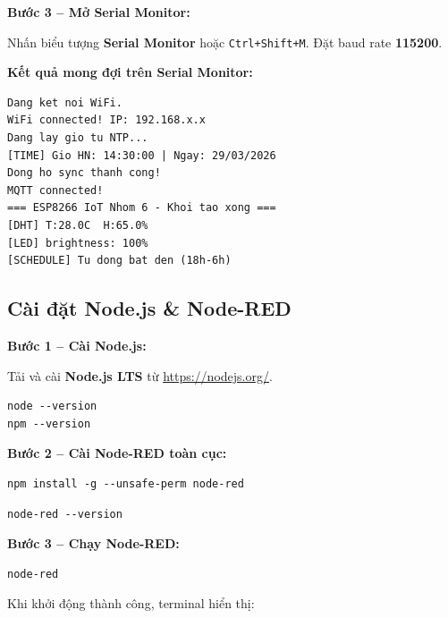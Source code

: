 \documentclass[13pt,a4paper]{article}
\newcommand{\code}[1]{\texttt{#1}}
\begin{document}
\textbf{Bước 3 -- Mở Serial Monitor:}

Nhấn biểu tượng \textbf{Serial Monitor} hoặc \code{Ctrl+Shift+M}. Đặt baud rate \textbf{115200}.

\textbf{Kết quả mong đợi trên Serial Monitor:}

\begin{lstlisting}[style=serialog, caption={Serial Monitor output khi khởi động}, label={lst:serial}]
Dang ket noi WiFi.
WiFi connected! IP: 192.168.x.x
Dang lay gio tu NTP...
[TIME] Gio HN: 14:30:00 | Ngay: 29/03/2026
Dong ho sync thanh cong!
MQTT connected!
=== ESP8266 IoT Nhom 6 - Khoi tao xong ===
[DHT] T:28.0C  H:65.0%
[LED] brightness: 100%
[SCHEDULE] Tu dong bat den (18h-6h)
\end{lstlisting}

\subsection{Cài đặt Node.js \& Node-RED}
\label{sec:noderedinstall}

\textbf{Bước 1 -- Cài Node.js:}

Tải và cài \textbf{Node.js LTS} từ \url{https://nodejs.org/}.

\begin{lstlisting}[style=bashcode, caption={Kiểm tra cài đặt Node.js}, label={lst:node}]
node --version
npm --version
\end{lstlisting}

\textbf{Bước 2 -- Cài Node-RED toàn cục:}

\begin{lstlisting}[style=bashcode, caption={Cài đặt Node-RED}, label={lst:nr}]
npm install -g --unsafe-perm node-red
\end{lstlisting}

\begin{lstlisting}[style=bashcode, caption={Kiểm tra phiên bản Node-RED}, label={lst:nrver}]
node-red --version
\end{lstlisting}

\textbf{Bước 3 -- Chạy Node-RED:}

\begin{lstlisting}[style=bashcode, caption={Chạy Node-RED}, label={lst:nrrun}]
node-red
\end{lstlisting}

Khi khởi động thành công, terminal hiển thị:
\end{document}
